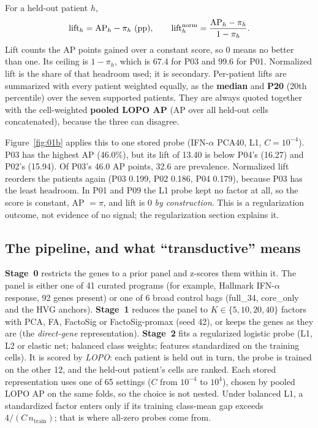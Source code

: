For a held-out patient $h$,
\[
  \lift_h=\mathrm{AP}_h-\pi_h \ \text{(pp)},\qquad
  \lift_h^{\mathrm{norm}}=\frac{\mathrm{AP}_h-\pi_h}{1-\pi_h}.
\]
Lift counts the AP points gained over a constant score, so 0 means no better than one. Its ceiling is $1-\pi_h$, which is 67.4\pp{} for P03 and 99.6\pp{} for P01. Normalized lift is the share of that headroom used; it is secondary. Per-patient lifts are summarized with every patient weighted equally, as the \textbf{median} and \textbf{P20} (20th percentile) over the seven supported patients. They are always quoted together with the cell-weighted \textbf{pooled LOPO AP} (AP over all held-out cells concatenated), because the three can disagree.

Figure~\ref{fig:01b} applies this to one stored probe (IFN-$\alpha$ PCA40, L1, $C=10^{-4}$). P03 has the highest AP (46.0\%), but its lift of 13.40\pp{} is below P04's (16.27\pp) and P02's (15.94\pp). Of P03's 46.0 AP points, 32.6 are prevalence. Normalized lift reorders the patients again (P03 0.199, P02 0.186, P04 0.179), because P03 has the least headroom. In P01 and P09 the L1 probe kept no factor at all, so the score is constant, AP $=\pi$, and lift is 0 \emph{by construction}. This is a regularization outcome, not evidence of no signal; the regularization section explains it.

\subsection*{The pipeline, and what ``transductive'' means}

\textbf{Stage~0} restricts the genes to a prior panel and z-scores them within it. The panel is either one of 41 curated programs (for example, Hallmark IFN-$\alpha$ response, 92 genes present) or one of 6 broad control bags (full\_34, core\_only and the HVG anchors). \textbf{Stage~1} reduces the panel to $K\in\{5,10,20,40\}$ factors with PCA, FA, FactoSig or FactoSig-promax (seed 42), or keeps the genes as they are (the \emph{direct-gene} representation). \textbf{Stage~2} fits a regularized logistic probe (L1, L2 or elastic net; balanced class weights; features standardized on the training cells). It is scored by \emph{LOPO}: each patient is held out in turn, the probe is trained on the other 12, and the held-out patient's cells are ranked. Each stored representation uses one of 65 settings ($C$ from $10^{-4}$ to $10^{4}$), chosen by pooled LOPO AP on the same folds, so the choice is not nested. Under balanced L1, a standardized factor enters only if its training class-mean gap exceeds $4/(C\,n_{\text{train}})$; that is where all-zero probes come from.

